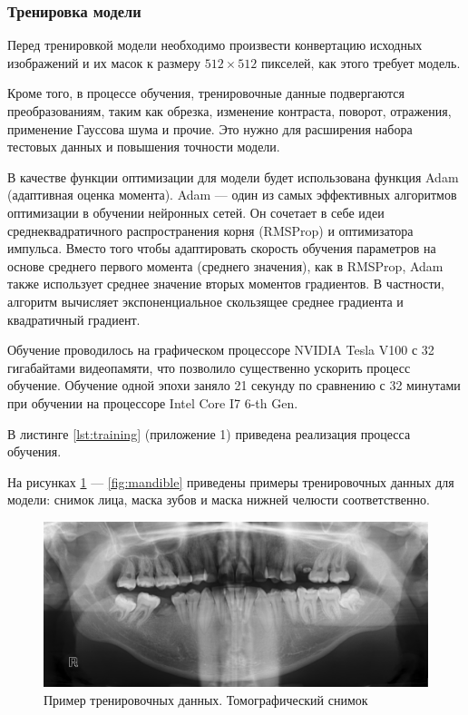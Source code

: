 \subsubsection{Тренировка модели}

Перед тренировкой модели необходимо произвести конвертацию исходных изображений и их масок к размеру $512 \times 512$ пикселей, как этого требует модель.

Кроме того, в процессе обучения, тренировочные данные подвергаются преобразованиям, таким как обрезка, изменение контраста, поворот, отражения, применение Гауссова шума и прочие. Это нужно для расширения набора тестовых данных и повышения точности модели.

В качестве функции оптимизации для модели будет использована функция Adam (адаптивная оценка момента). Adam --- один из самых эффективных алгоритмов оптимизации в обучении нейронных сетей. Он сочетает в себе идеи среднеквадратичного распространения корня (RMSProp) и оптимизатора импульса. Вместо того чтобы адаптировать скорость обучения параметров на основе среднего первого момента (среднего значения), как в RMSProp, Adam также использует среднее значение вторых моментов градиентов. В частности, алгоритм вычисляет экспоненциальное скользящее среднее градиента и квадратичный градиент.

Обучение проводилось на графическом процессоре NVIDIA Tesla V100 с 32 гигабайтами видеопамяти, что позволило существенно ускорить процесс обучение. Обучение одной эпохи заняло 21 секунду по сравнению с 32 минутами при обучении на процессоре Intel Core I7 6-th Gen.

В листинге \ref{lst:training} (приложение 1)  приведена реализация процесса обучения.

На рисунках \ref{fig:scan} --- \ref{fig:mandible} приведены примеры тренировочных данных для модели: снимок лица, маска зубов и маска нижней челюсти соответственно.

\begin{figure}[H]
	\centering
	\includegraphics[width=\textwidth]{img/scan.png}
	\caption{Пример тренировочных данных. Томографический снимок}
	\label{fig:scan}
\end{figure}

